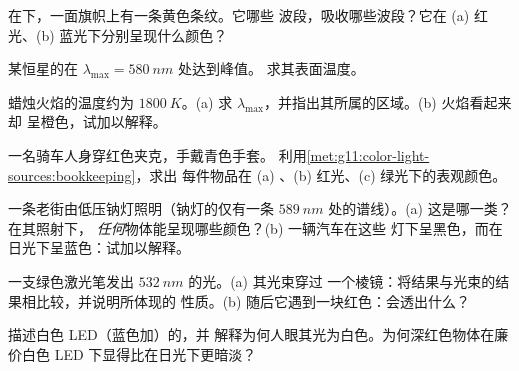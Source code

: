 \begin{exercise}[$\star$]\label{exo:g11:color-light-sources:4}
在下，一面旗帜上有一条黄色条纹。它哪些
波段，吸收哪些波段？它在 (a) 红光、(b) 蓝光下分别呈现什么颜色？
\end{exercise}

\begin{exercise}[$\star$]\label{exo:g11:color-light-sources:5}
某恒星的在 $\lambda_{\max} = \qty{580}{nm}$ 处达到峰值。
求其表面温度。
\end{exercise}

\begin{exercise}[$\star\star$]\label{exo:g11:color-light-sources:6}
蜡烛火焰的温度约为 $\qty{1800}{K}$。(a) 求
$\lambda_{\max}$，并指出其所属的区域。(b) 火焰看起来却
呈橙色，试加以解释。
\end{exercise}

\begin{exercise}[$\star\star$]\label{exo:g11:color-light-sources:7}
一名骑车人身穿红色夹克，手戴青色手套。
利用\cref{met:g11:color-light-sources:bookkeeping}，求出
每件物品在 (a) 、(b) 红光、(c) 绿光下的表观颜色。
\end{exercise}

\begin{exercise}[$\star\star$]\label{exo:g11:color-light-sources:8}
一条老街由低压钠灯照明（钠灯的仅有一条
$\qty{589}{nm}$ 处的谱线）。(a) 这是哪一类？在其照射下，
\emph{任何}物体能呈现哪些颜色？(b) 一辆汽车在这些
灯下呈黑色，而在日光下呈蓝色：试加以解释。
\end{exercise}

\begin{exercise}[$\star\star$]\label{exo:g11:color-light-sources:9}
一支绿色激光笔发出 $\qty{532}{nm}$ 的光。(a) 其光束穿过
一个棱镜：将结果与光束的结果相比较，并说明所体现的
性质。(b) 随后它遇到一块红色：会透出什么？
\end{exercise}

\begin{exercise}[$\star\star$]\label{exo:g11:color-light-sources:10}
描述白色 LED（蓝色加）的，并
解释为何人眼其光为白色。为何深红色物体在廉价白色 LED
下显得比在日光下更暗淡？
\end{exercise}

